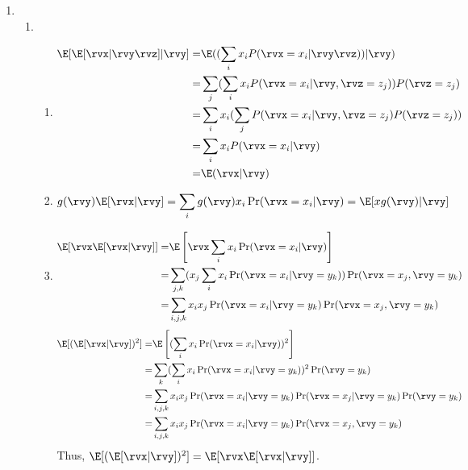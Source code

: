 \documentclass[a4paper]{article}
\begin{document}
\begin{enumerate}
  \setlength{\itemsep}{3\parskip}

\item
  \begin{enumerate}
    \item 
    \begin{enumerate}
        \item 
        \begin{equation*}
            \begin{align*}
                \E[\E[\rvx|\rvy \rvz]|\rvy] = & \E((\sum_{i} x_i P(\rvx=x_i| \rvy \rvz))|\rvy)\\
                =&\sum_j (\sum_{i} x_i P(\rvx=x_i|\rvy,\rvz=z_j))P(\rvz=z_j) \\
                =&\sum_i x_i(\sum_{j}P(\rvx=x_i| \rvy,\rvz=z_j)P(\rvz=z_j)) \\
                =&\sum_i x_i P(\rvx=x_i| \rvy) \\
                =&\E(\rvx|\rvy)
            \end{align*}
        \end{equation*}
        \item
        \begin{equation*}
             g(\rvy)\E[\rvx|\rvy]=\sum_{i} g(\rvy)x_i\Pr(\rvx=x_i|\rvy)=\E[xg(\rvy)|\rvy]
        \end{equation*}
        
        \item
        \begin{equation*}
            \begin{align*}
            \E[\rvx\E[\rvx|\rvy]]=&\E\left[\rvx\sum_{i} x_i\Pr(\rvx=x_i|\rvy)\right]\\
            =&\sum_{j,k}(x_j\sum_{i} x_i\Pr(\rvx=x_i|\rvy=y_k))\Pr(\rvx=x_j,\rvy=y_k)\\
            =&\sum_{i,j,k} x_i x_j \Pr(\rvx=x_i|\rvy=y_k)\Pr(\rvx=x_j,\rvy=y_k)
        \end{align*}
        \end{equation*}
        \begin{equation*}
            \begin{align*}
        \E[(\E[\rvx|\rvy])^2]=&\E\left[(\sum_{i} x_i\Pr(\rvx=x_i|\rvy))^2\right]\\
        =&\sum_{k}(\sum_{i} x_i\Pr(\rvx=x_i|\rvy=y_k))^2 \Pr(\rvy=y_k)\\
        =&\sum_{i,j,k} x_i x_j\Pr(\rvx=x_i|\rvy=y_k)\Pr(\rvx=x_j|\rvy=y_k)\Pr(\rvy=y_k)\\
        =&\sum_{i,j,k} x_i x_j\Pr(\rvx=x_i|\rvy=y_k)\Pr(\rvx=x_j,\rvy=y_k)
        \end{align*}
        \end{equation*}
        Thus, $\E[(\E[\rvx|\rvy])^2]=\E[\rvx\E[\rvx|\rvy]]$.
        

\end{enumerate}
\end{enumerate}
\end{enumerate}
\end{document}
